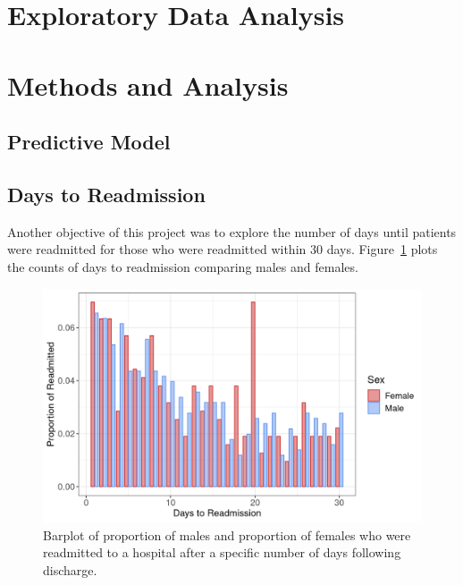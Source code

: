 \documentclass[sn-basic,pdflatex]{sn-jnl}
\theoremstyle{remark}
\theoremstyle{definition}
\begin{document}
\hypertarget{sec3}{%
\section{Exploratory Data Analysis}\label{sec3}}

\hypertarget{sec4}{%
\section{Methods and Analysis}\label{sec4}}

\hypertarget{predictive-model}{%
\subsection{Predictive Model}\label{predictive-model}}

\hypertarget{days-to-readmission}{%
\subsection{Days to Readmission}\label{days-to-readmission}}

Another objective of this project was to explore the number of days
until patients were readmitted for those who were readmitted within 30
days. Figure~\ref{fig:daysto} plots the counts of days to readmission
comparing males and females. \newline

\begin{figure}[H]

{\centering \includegraphics[width=1\linewidth]{figures/daysto} 

}

\caption{Barplot of proportion of males and proportion of females who were readmitted to a hospital after a specific number of days following discharge.}\label{fig:daysto}
\end{figure}
\end{document}
